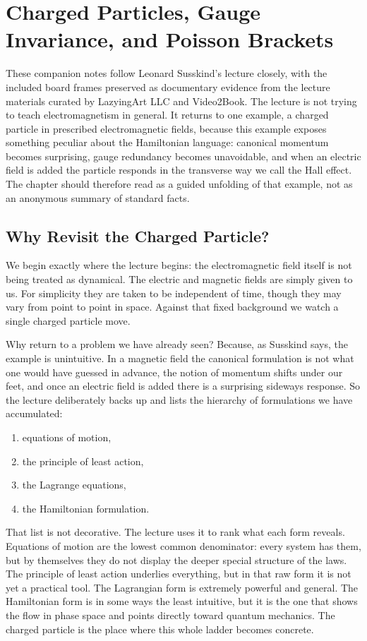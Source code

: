 \chapter{Charged Particles, Gauge Invariance, and Poisson Brackets}

These companion notes follow Leonard Susskind's lecture closely, with the included board frames preserved as documentary evidence from the lecture materials curated by LazyingArt LLC and Video2Book. The lecture is not trying to teach electromagnetism in general. It returns to one example, a charged particle in prescribed electromagnetic fields, because this example exposes something peculiar about the Hamiltonian language: canonical momentum becomes surprising, gauge redundancy becomes unavoidable, and when an electric field is added the particle responds in the transverse way we call the Hall effect. The chapter should therefore read as a guided unfolding of that example, not as an anonymous summary of standard facts.

\section{Why Revisit the Charged Particle?}

We begin exactly where the lecture begins: the electromagnetic field itself is not being treated as dynamical. The electric and magnetic fields are simply given to us. For simplicity they are taken to be independent of time, though they may vary from point to point in space. Against that fixed background we watch a single charged particle move.

Why return to a problem we have already seen? Because, as Susskind says, the example is unintuitive. In a magnetic field the canonical formulation is not what one would have guessed in advance, the notion of momentum shifts under our feet, and once an electric field is added there is a surprising sideways response. So the lecture deliberately backs up and lists the hierarchy of formulations we have accumulated:
\begin{enumerate}
\item equations of motion,
\item the principle of least action,
\item the Lagrange equations,
\item the Hamiltonian formulation.
\end{enumerate}

That list is not decorative. The lecture uses it to rank what each form reveals. Equations of motion are the lowest common denominator: every system has them, but by themselves they do not display the deeper special structure of the laws. The principle of least action underlies everything, but in that raw form it is not yet a practical tool. The Lagrangian form is extremely powerful and general. The Hamiltonian form is in some ways the least intuitive, but it is the one that shows the flow in phase space and points directly toward quantum mechanics. The charged particle is the place where this whole ladder becomes concrete.

